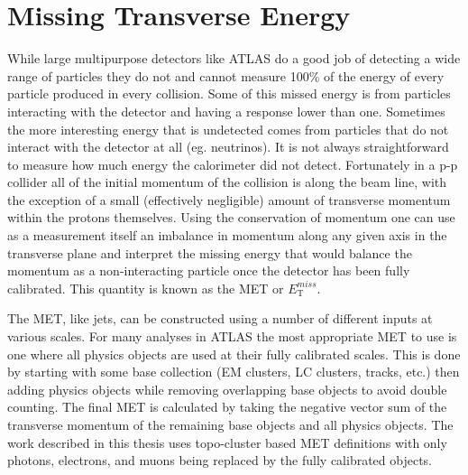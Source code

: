 \section{Missing Transverse Energy}
\label{Sec:MET}
While large multipurpose detectors like ATLAS do a good job of detecting a wide range of particles they do not and cannot measure 100\% of the energy of every particle produced in every collision.  
Some of this missed energy is from particles interacting with the detector and having a response lower than one.  
Sometimes the more interesting energy that is undetected comes from particles that do not interact with the detector at all (eg. neutrinos).  
It is not always straightforward to measure how much energy the calorimeter did not detect.  
Fortunately in a p-p collider all of the initial momentum of the collision is along the beam line, with the exception of a small (effectively negligible) amount of transverse momentum within the protons themselves.  
Using the conservation of momentum one can use as a measurement itself an imbalance in momentum along any given axis in the transverse plane and interpret the missing energy that would balance the momentum as a non-interacting particle once the detector has been fully calibrated.  
This quantity is known as the \gls{MET} or $E_{\mathrm T}^{miss}$.  


The MET, like jets, can be constructed using a number of different inputs at various scales.  
For many analyses in ATLAS the most appropriate MET to use is one where all physics objects are used at their fully calibrated scales.  
This is done by starting with some base collection (EM clusters, LC clusters, tracks, etc.) then adding physics objects while removing overlapping base objects to avoid double counting.  
The final MET is calculated by taking the negative vector sum of the transverse momentum of the remaining base objects and all physics objects.  
The work described in this thesis uses topo-cluster based MET definitions with only photons, electrons, and muons being replaced by the fully calibrated objects.  





